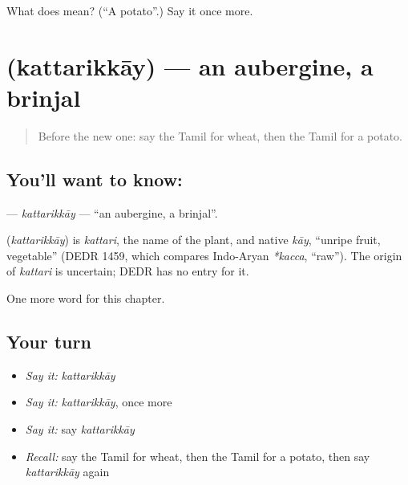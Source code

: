 \begin{tcolorbox}[breakable,colback=teal!4,colframe=teal!35!black,title={Before you move on}]
What does  mean? (\textquotedblleft{}A potato\textquotedblright{}.) Say it once more.
\end{tcolorbox}
\section[\texorpdfstring{\ta{கத்தரிக்காய்} (kattarikkāy)}{கத்தரிக்காய் (kattarikkāy)}]{ (kattarikkāy) — an aubergine, a brinjal}

\label{lesson:TA-C243-kattarikkay}



\begin{quote}
Before the new one: say the Tamil for wheat, then the Tamil for a potato.
\end{quote}

\subsection*{You'll want to know: }
\textbf{} — \emph{kattarikkāy} — \textquotedblleft{}an aubergine, a brinjal\textquotedblright{}.

\begin{cousinweb}
\textbf{} (\emph{kattarikkāy}) is \emph{kattari}, the name of the plant, and native \emph{kāy}, \textquotedblleft{}unripe fruit, vegetable\textquotedblright{} (DEDR 1459, which compares Indo-Aryan \emph{*kacca}, \textquotedblleft{}raw\textquotedblright{}). The origin of \emph{kattari} is uncertain; DEDR has no entry for it.
\end{cousinweb}

\begin{grammarlens}[title={What you've built}]
One more word for this chapter.
\end{grammarlens}

\subsection*{Your turn}
\begin{itemize}
\raggedright
  \item \emph{Say it:} \emph{kattarikkāy}
  \item \emph{Say it:} \emph{kattarikkāy}, once more
  \item \emph{Say it:} say \emph{kattarikkāy}
  \item \emph{Recall:} say the Tamil for wheat, then the Tamil for a potato, then say \emph{kattarikkāy} again
\end{itemize}

